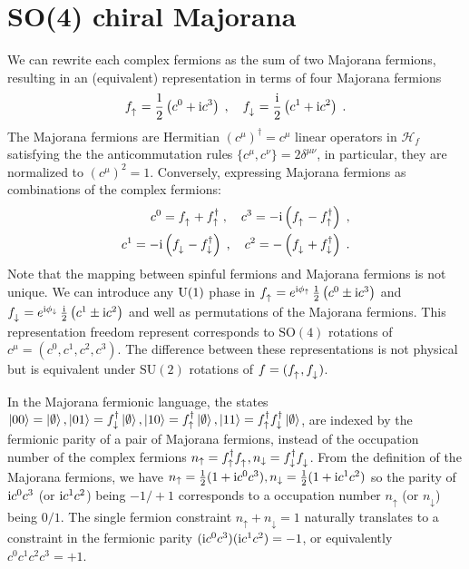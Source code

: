 
\section{SO(4) chiral Majorana  }

We can rewrite each complex fermions as the sum of two Majorana fermions, resulting in an (equivalent) representation in terms of four Majorana fermions \cite{Burnell_2011,You2012}
\begin{equation}
    f_\uparrow^\pd = \frac{1}{2} \left( c^0 + \im c^3 \right) \; , \quad
    f_\downarrow^\pd = \frac{\im}{2} \left( c^1 + \im c^2 \right) \; .
\end{equation}
The Majorana fermions are Hermitian $(c^\mu)^\dagger=c^\mu$ linear operators in $\mathcal{H}_f$ satisfying the the anticommutation rules $\{c^\mu,c^\nu \} = 2 \delta^{\mu \nu}$, in particular, they are normalized to $(c^\mu)^2=1$.
Conversely, expressing Majorana fermions as combinations of the complex fermions:
\begin{equation}
\begin{split}
    c^0 = f_\uparrow^\pd + f_\uparrow^\dagger \; , \quad
    c^3 = -\im \left( f_\uparrow^\pd - f_\uparrow^\dagger \right)  \; , \\
    c^1 =  -\im \left(f_\downarrow^\pd - f_\downarrow^\dagger\right) \; , \quad
    c^2 = - \left( f_\downarrow^\pd + f_\downarrow^\dagger \right)  \; . \label{eq:parton-Maj}
\end{split}
\end{equation}
Note that the mapping between spinful fermions and Majorana fermions is not unique. We can introduce any $\mathrm{U}(1)$ phase in $f_\uparrow^\pd = e^{\im \phi_\uparrow}\, \frac{1}{2} \left( c^0 \pm \im c^3 \right)$ and $ f_\downarrow^\pd = e^{\im \phi_\downarrow}\,  \frac{\im}{2} \left( c^1 \pm \im c^2 \right)$ and well as permutations of the Majorana fermions. This representation freedom represent corresponds to $\mathrm{SO}(4)$ rotations of $c^\mu = (c^0,c^1,c^2,c^3)$.
The difference between these representations is not physical but is equivalent under $\mathrm{SU}(2)$ rotations of $f=(f_\uparrow^\pd, f_\downarrow^\pd)$.

In the Majorana fermionic language, the states $\ket{00}=\ket{\emptyset},\ket{01}= f_{\downarrow}^\dagger \ket{\emptyset},  \ket{10}=f_{\uparrow}^\dagger
\ket{\emptyset}, \ket{11}= f_{\uparrow}^\dagger f_{\downarrow}^\dagger \ket{\emptyset}$, are indexed by the fermionic parity of a pair of Majorana fermions, instead of the occupation number of the complex fermions $n_\uparrow=f^\dagger_\uparrow f^\pd_\uparrow,n_\downarrow=f^\dagger_\downarrow f^\pd_\downarrow$.
From the definition of the Majorana fermions, we have $n_\uparrow=\frac12 (1+\mathrm{i} c^0 c^3), n_\downarrow=\frac12 (1+\mathrm{i} c^1 c^2)$ so the parity of $\mathrm{i} c^0 c^3$ (or $\mathrm{i} c^1 c^2$) being   $-1/+1$ corresponds to a occupation number $n_\uparrow$ (or $n_\downarrow$) being $0/1$. The single fermion constraint $n_\uparrow+n_\downarrow=1$ naturally translates to a constraint in the fermionic parity $(\mathrm{i} c^0 c^3)(\mathrm{i} c^1 c^2)=-1$, or equivalently $c^0  c^1 c^2 c^3=+1$.



